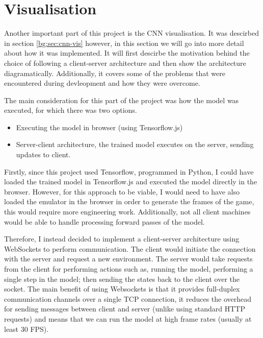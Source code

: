 \section{Visualisation}

Another important part of this project is the CNN visualisation. It was descirbed in section \ref{bg:sec:cnn-vis} however, in this section we will go into more detail about how it was implemented. It will first descirbe the motivation behind the choice of following a client-server architecture and then show the architecture diagramatically. Additionally, it covers some of the problems that were encountered during devleopment and how they were overcome.

The main consideration for this part of the project was how the model was executed, for which there was two options.

\begin{itemize}
  \item Executing the model in browser (using Tensorflow.js)
  \item Server-client architecture, the trained model executes on the server, sending updates to client.
\end{itemize}

Firstly, since this project used Tensorflow, programmed in Python, I could have loaded the trained model in Tensorflow.js and executed the model directly in the browser. However, for this approach to be viable, I would need to have also loaded the emulator in the browser in order to generate the frames of the game, this would require more engineering work. Additionally, not all client machines would be able to handle processing forward passes of the model.

Therefore, I instead decided to implement a client-server architecture using WebSockets to perform communication. The client would initiate the connection with the server and request a new environment. The server would take requests from the client for performing actions such as, running the model, performing a single step in the model; then sending the states back to the client over the socket. The main benefit of using Websockets is that it provides full-duplex communication channels over a single TCP connection, it reduces the overhead for sending messages between client and server (unlike using standard HTTP requests) and means that we can run the model at high frame rates (usually at least 30 FPS).